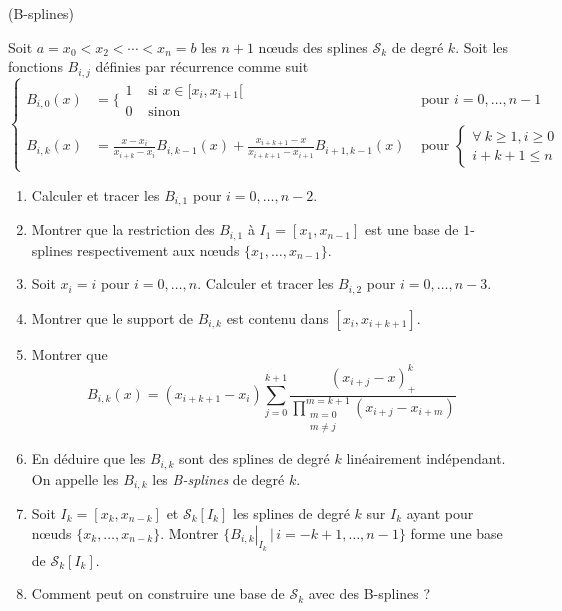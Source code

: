 \documentclass[a4paper,12pt,reqno]{amsart}
\begin{document}
\begin{exo} (B-splines)

  Soit $a=x_{0}<x_{2}<\cdots<x_{n}=b$ les $n+1$ nœuds des splines $\mathcal{S}_{k}$ de degré $k$. Soit les fonctions $B_{i,j}$ définies par récurrence comme suit
    $$
      \left\{
      \begin{array}{rll}
        B_{i,0}(x) & =
          \Bigg\{
          \begin{array}{rl}
            1 & \text{ si } x \in [x_{i},x_{i+1}[\\
            0 & \text{ sinon }
          \end{array}               & \text{ pour } i=0,\ldots,n-1\\[3ex]
        B_{i,k}(x) & = \frac{x-x_{i}}{x_{i+k}-x_{i}}B_{i,k-1}(x)
                  + \frac{x_{i+k+1}-x}{x_{i+k+1}-x_{i+1}}B_{i+1,k-1}(x)
                                    & \text{ pour }
                                      \left\{
                                        \begin{array}{r}
                                          \forall\ k \geq 1, i \geq 0\\
                                           i+k+1 \leq n
                                        \end{array}
                                      \right.
      \end{array}
      \right.
    $$\vspace{0pt}
  \begin{enumerate}
    \item Calculer et tracer les $B_{i,1}$ pour $i=0,\ldots,n-2$.
    \item Montrer que la restriction des $B_{i,1}$ à $I_{1}=[x_{1},x_{n-1}]$ est une base de $1$-splines respectivement aux nœuds $\{x_{1},\ldots,x_{n-1}\}$.
    \item Soit $x_{i}=i$ pour $i=0,\ldots,n$. Calculer et tracer les $B_{i,2}$ pour $i=0,\ldots,n-3$.
    \item Montrer que le support de $B_{i,k}$ est contenu dans $[x_{i},x_{i+k+1}]$.
    \item Montrer que
      $$
        B_{i,k}(x) = (x_{i+k+1}-x_{i})
            \sum_{j=0}^{k+1}
              \frac{(x_{i+j}-x)_{+}^{k}}{\displaystyle\prod_{\substack{m=0 \\ m\neq j}}^{m=k+1}(x_{i+j}-x_{i+m})}
      $$
    \item En déduire que les $B_{i,k}$ sont des splines de degré $k$ linéairement indépendant.\newline
      On appelle les $B_{i,k}$ les \emph{B-splines} de degré $k$.
    \item Soit $I_{k}=[x_{k},x_{n-k}]$ et  $\mathcal{S}_{k}[I_{k}]$ les splines de degré $k$ sur $I_{k}$ ayant pour nœuds $\{x_{k},\ldots,x_{n-k}\}$. Montrer $\{\left.B_{i,k}\right|_{I_{k}} \,|\, i=-k+1,\ldots,n-1 \}$ forme une base de $\mathcal{S}_{k}[I_{k}]$.
    \item Comment peut on construire une base de $\mathcal{S}_{k}$ avec des B-splines ?
  \end{enumerate}
\end{exo}
\end{document}
